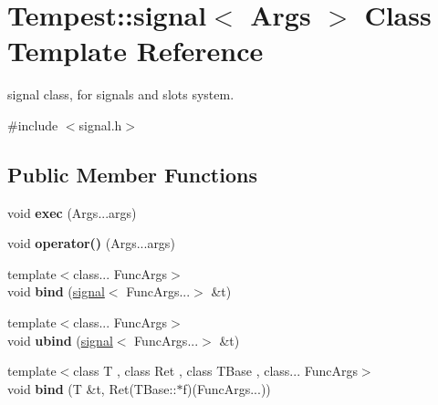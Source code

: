 \hypertarget{class_tempest_1_1signal}{\section{Tempest\+:\+:signal$<$ Args $>$ Class Template Reference}
\label{class_tempest_1_1signal}
}


signal class, for signals and slots system.  




{\ttfamily \#include $<$signal.\+h$>$}

\subsection*{Public Member Functions}
\begin{DoxyCompactItemize}
\item 
\hypertarget{class_tempest_1_1signal_a5bb1345c51e321d06308d10091b54827}{void {\bfseries exec} (Args...\+args)}\label{class_tempest_1_1signal_a5bb1345c51e321d06308d10091b54827}

\item 
\hypertarget{class_tempest_1_1signal_a4f630ea6a3f18c82a7e7a1d5b2348135}{void {\bfseries operator()} (Args...\+args)}\label{class_tempest_1_1signal_a4f630ea6a3f18c82a7e7a1d5b2348135}

\item 
\hypertarget{class_tempest_1_1signal_aa6b0cb591dffbe2de1143ebbcd0a4e43}{{\footnotesize template$<$class... Func\+Args$>$ }\\void {\bfseries bind} (\hyperlink{class_tempest_1_1signal}{signal}$<$ Func\+Args...$>$ \&t)}\label{class_tempest_1_1signal_aa6b0cb591dffbe2de1143ebbcd0a4e43}

\item 
\hypertarget{class_tempest_1_1signal_a3c95a1cbafb32dd69e19284d7b6d7cac}{{\footnotesize template$<$class... Func\+Args$>$ }\\void {\bfseries ubind} (\hyperlink{class_tempest_1_1signal}{signal}$<$ Func\+Args...$>$ \&t)}\label{class_tempest_1_1signal_a3c95a1cbafb32dd69e19284d7b6d7cac}

\item 
\hypertarget{class_tempest_1_1signal_af6092c02be4fc389d2a2a440013f9f5b}{{\footnotesize template$<$class T , class Ret , class T\+Base , class... Func\+Args$>$ }\\void {\bfseries bind} (T \&t, Ret(T\+Base\+::$\ast$f)(Func\+Args...))}\label{class_tempest_1_1signal_af6092c02be4fc389d2a2a440013f9f5b}


\end{DoxyCompactItemize}
